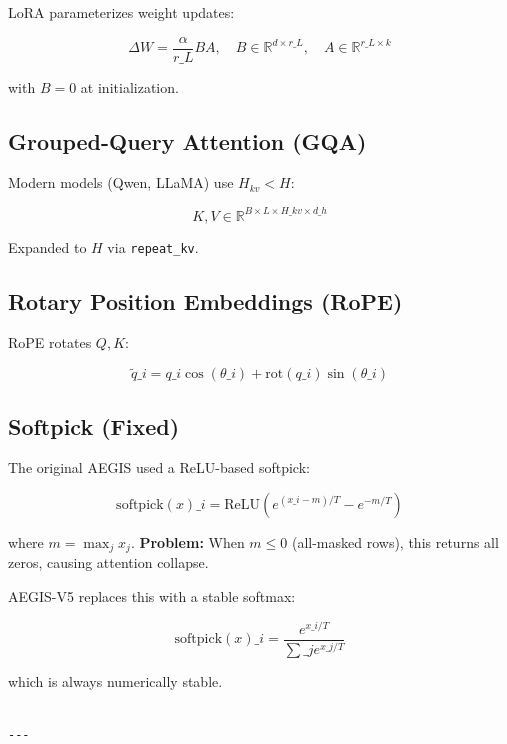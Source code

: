 LoRA parameterizes weight updates:

\[
\Delta W = \frac{\alpha}{r\_L} B A, \quad B \in \mathbb{R}^{d \times r\_L}, \quad A \in \mathbb{R}^{r\_L \times k}
\]

with $B = 0$ at initialization.

\subsection{Grouped-Query Attention (GQA)}

Modern models (Qwen, LLaMA) use $H_{kv} < H$:

\[
K, V \in \mathbb{R}^{B \times L \times H\_{kv} \times d\_h}
\]

Expanded to $H$ via \texttt{repeat\_kv}.

\subsection{Rotary Position Embeddings (RoPE)}

RoPE rotates $Q, K$:

\[
\tilde{q}\_i = q\_i \cos(\theta\_i) + \text{rot}(q\_i) \sin(\theta\_i)
\]

\subsection{Softpick (Fixed)}

The original AEGIS used a ReLU-based softpick:

\[
\text{softpick}(x)\_i = \text{ReLU}\!\left(e^{(x\_i - m)/T} - e^{-m/T}\right)
\]

where $m = \max_j x_j$. \textbf{Problem:} When $m \leq 0$ (all-masked rows), 
this returns all zeros, causing attention collapse.

AEGIS-V5 replaces this with a stable softmax:

\[
\text{softpick}(x)\_i = \frac{e^{x\_i / T}}{\sum\_j e^{x\_j / T}}
\]

which is always numerically stable.
\begin{lstlisting}

---
\end{lstlisting}
